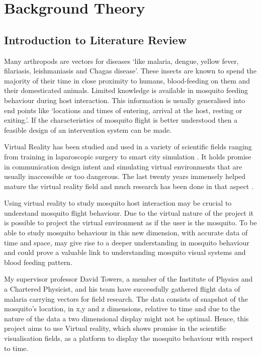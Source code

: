 
\chapter{Background Theory}
\label{ch:background}

\section{Introduction to Literature Review}
Many arthropods are vectors for diseases `like malaria, dengue, yellow fever, filariasis, leishmaniasis and Chagas disease'\cite{angarita2016novel}. These insects are known to spend the majority of their time in close proximity to humans, blood-feeding on them and their domesticated animals. Limited knowledge is available in mosquito feeding behaviour during host interaction. This information is usually generalised into end points like  `locations and times of entering, arrival at the host, resting or exiting.'\cite{angarita2016novel}. If the characteristics of mosquito flight is better understood then a feasible design of an intervention system can be made.

Virtual Reality has been studied and used in a variety of scientific fields ranging from training in laparoscopic surgery \cite{gurusamy2009virtual} to smart city simulation \cite{lv2016virtual}. It holds promise in communication design intent and simulating virtual environments that are usually inaccessible or too dangerous. The last twenty years immensely helped mature the virtual reality field and much research has been done in that aspect \cite{steuer1992defining}. 

Using virtual reality to study mosquito host interaction may be crucial to understand mosquito flight behaviour. Due to the virtual nature of the project it is possible to project the virtual environment as if the user is the mosquito. To be able to study mosquito behaviour in this new dimension, with accurate data of time and space, may give rise to a deeper understanding in mosquito behaviour and could prove a valuable link to understanding mosquito visual systems and blood feeding pattern.

My supervisor professor David Towers, a member of the Institute of Physics and a Chartered Physicist, and his team have successfully gathered flight data of malaria carrying vectors for field research. The data consists of snapshot of the mosquito's location, in x,y and z dimensions, relative to time and due to the nature of the data a two dimensional display might not be optimal. Hence, this project aims to use Virtual reality, which shows promise in the scientific visualisation fields, as a platform to display the mosquito behaviour with respect to time. 



